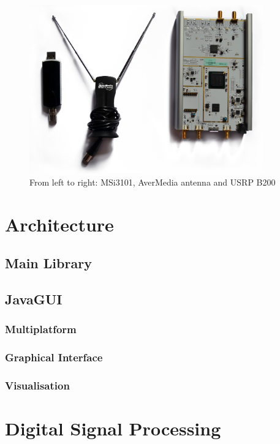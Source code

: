 \documentclass[a4paper,12pt,twoside,openright]{report}
\begin{document}
\begin{figure}[h!]
 
  \centering
    \includegraphics[width=0.9\textwidth]{equipment}
    \caption{From left to right: MSi3101, AverMedia antenna and USRP B200}
\end{figure}


\section{Architecture}

\subsection{Main Library}

\subsection{JavaGUI}

\subsubsection{Multiplatform}

\subsubsection{Graphical Interface}

\subsubsection{Visualisation}

\section{Digital Signal Processing}
\end{document}
